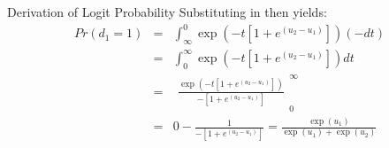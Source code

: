 \documentclass[english,aspectratio=169,12pt,xcolor=dvipsnames]{beamer}
\begin{document}
\begin{frame}[noframenumbering]{Derivation of Logit Probability}
Substituting in then yields:
\begin{eqnarray*}
Pr(d_1=1)&=&\int_{\infty}^0\exp\left(-t\left[1+e^{(u_2-u_1)}\right]\right)(-dt)\\
&=&\int_0^{\infty}\exp\left(-t\left[1+e^{(u_2-u_1)}\right]\right)dt\\
&=&\begin{array}{c|}\frac{\exp\left(-t\left[1+e^{(u_2-u_1)}\right]\right)}{-\left[1+e^{(u_2-u_1)}\right]}\end{array}^{\infty}_{0}\\
&=&0-\frac{1}{-\left[1+e^{(u_2-u_1)}\right]}=\frac{\exp(u_1)}{\exp(u_1)+\exp(u_2)}
\end{eqnarray*}
\end{frame}

%
%
\end{document}
